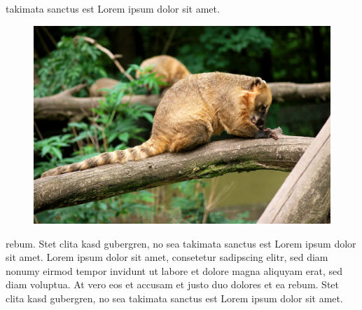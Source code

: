 \documentclass[a4paper]{scrreprt}
\begin{document}
takimata sanctus est Lorem ipsum dolor sit amet.
\begin{figure}[h]
    \centering
    \includegraphics*[width=0.5\linewidth]{YourImage.jpg}
\end{figure}
rebum. Stet clita kasd gubergren, no sea takimata sanctus est Lorem
ipsum dolor sit amet. Lorem ipsum dolor sit amet, consetetur
sadipscing elitr, sed diam nonumy eirmod tempor invidunt ut labore et
dolore magna aliquyam erat, sed diam voluptua. At vero eos et accusam
et justo duo dolores et ea rebum. Stet clita kasd gubergren, no sea
takimata sanctus est Lorem ipsum dolor sit amet.
\end{document}
